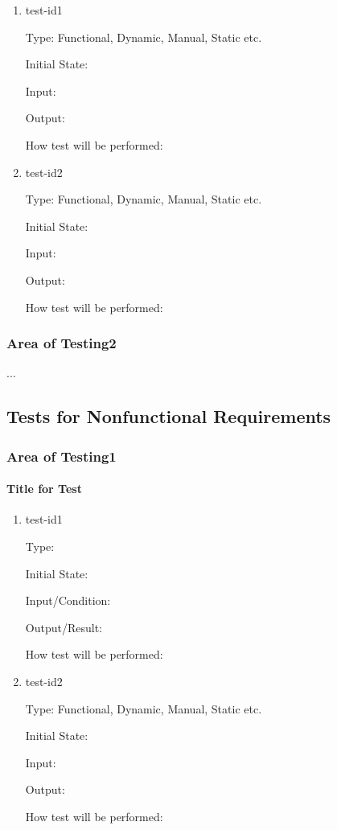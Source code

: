 \documentclass[12pt, titlepage]{article}
\begin{document}
\begin{enumerate}

\item{test-id1\\}

Type: Functional, Dynamic, Manual, Static etc.
					
Initial State: 
					
Input: 
					
Output: 
					
How test will be performed: 
					
\item{test-id2\\}

Type: Functional, Dynamic, Manual, Static etc.
					
Initial State: 
					
Input: 
					
Output: 
					
How test will be performed: 

\end{enumerate}

\subsubsection{Area of Testing2}

...

\subsection{Tests for Nonfunctional Requirements}

\subsubsection{Area of Testing1}
		
\paragraph{Title for Test}

\begin{enumerate}

\item{test-id1\\}

Type: 
					
Initial State: 
					
Input/Condition: 
					
Output/Result: 
					
How test will be performed: 
					
\item{test-id2\\}

Type: Functional, Dynamic, Manual, Static etc.
					
Initial State: 
					
Input: 
					
Output: 
					
How test will be performed: 

\end{enumerate}
\end{document}

